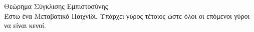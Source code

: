 \begin{theoremgr}{Θεώρημα Σύγκλισης Εμπιστοσύνης} \ \\
  \label{convergence}
  Έστω ένα Μεταβατικό Παιχνίδι. Υπάρχει γύρος τέτοιος ώστε όλοι οι επόμενοι γύροι να είναι κενοί.
\end{theoremgr}
